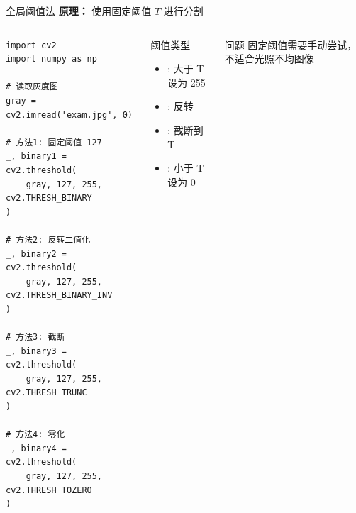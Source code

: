 \begin{frame}[fragile]{全局阈值法}
    \textbf{原理：} 使用固定阈值 $T$ 进行分割

    \begin{columns}
        \begin{lstlisting}[basicstyle=\ttfamily\scriptsize]
import cv2
import numpy as np

# 读取灰度图
gray = cv2.imread('exam.jpg', 0)

# 方法1: 固定阈值 127
_, binary1 = cv2.threshold(
    gray, 127, 255, cv2.THRESH_BINARY
)

# 方法2: 反转二值化
_, binary2 = cv2.threshold(
    gray, 127, 255, cv2.THRESH_BINARY_INV
)

# 方法3: 截断
_, binary3 = cv2.threshold(
    gray, 127, 255, cv2.THRESH_TRUNC
)

# 方法4: 零化
_, binary4 = cv2.threshold(
    gray, 127, 255, cv2.THRESH_TOZERO
)
        \end{lstlisting}

        \begin{block}{阈值类型}
            \begin{itemize}
                \item {}: 大于 T 设为 255
                \item {}: 反转
                \item {}: 截断到 T
                \item {}: 小于 T 设为 0
            \end{itemize}
        \end{block}

        \begin{alertblock}{问题}
            固定阈值需要手动尝试，不适合光照不均图像
        \end{alertblock}
    \end{columns}
\end{frame}

